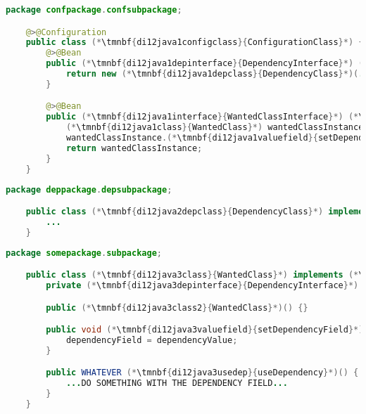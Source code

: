 \emtwen
{}%
\begin{lstlisting}[language=Java, title={Configuration class}]
    package confpackage.confsubpackage;

    @>@Configuration
    public class (*\tmnbf{di12java1configclass}{ConfigurationClass}*) {
        @>@Bean
        public (*\tmnbf{di12java1depinterface}{DependencyInterface}*) (*\tmnbf{di12java1depbeanid}{dependencyBeanMethod}*)() {
            return new (*\tmnbf{di12java1depclass}{DependencyClass}*)(...);
        }

        @>@Bean
        public (*\tmnbf{di12java1interface}{WantedClassInterface}*) (*\tmnbf{di12java1beanid}{wantedBeanMethod}*)() {
            (*\tmnbf{di12java1class}{WantedClass}*) wantedClassInstance = new (*\tmnbf{di12java1class2}{WantedClass}*)();
            wantedClassInstance.(*\tmnbf{di12java1valuefield}{setDependencyField}*)((*\tmnbf{di12java1depbeanid2}{dependencyBeanMethod}*)());
            return wantedClassInstance;
        }
    }
\end{lstlisting}
\begin{lstlisting}[language=Java, title={Dependency class}]
    package deppackage.depsubpackage;

    public class (*\tmnbf{di12java2depclass}{DependencyClass}*) implements (*\tmnbf{di12java2depinterface}{DependencyInterface}*) {
        ...
    }
\end{lstlisting}
\begin{lstlisting}[language=Java, title={Wanted class with the zero--parameter constructor and the setter method}]
    package somepackage.subpackage;

    public class (*\tmnbf{di12java3class}{WantedClass}*) implements (*\tmnbf{di12java3interface}{WantedClassInterface}*) {
        private (*\tmnbf{di12java3depinterface}{DependencyInterface}*) dependencyField;

        public (*\tmnbf{di12java3class2}{WantedClass}*)() {}

        public void (*\tmnbf{di12java3valuefield}{setDependencyField}*)((*\tmnbf{di12java3depinterface2}{DependencyInterface}*) dependencyField){
            dependencyField = dependencyValue;
        }

        public WHATEVER (*\tmnbf{di12java3usedep}{useDependency}*)() {
            ...DO SOMETHING WITH THE DEPENDENCY FIELD...
        }
    }
\end{lstlisting}
